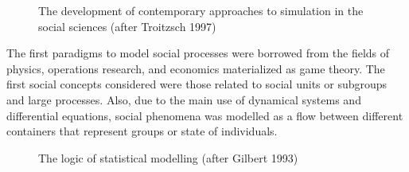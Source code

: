 \documentclass{report}
\begin{document}
\begin{figure}[tp]
\setlength\fboxsep{0pt}
\setlength\fboxrule{0.5pt}
\caption{The development of contemporary approaches to simulation in the social sciences (after Troitzsch 1997)}
\label{fig:SimTL}
\end{figure}


The first paradigms to model social processes were borrowed from the fields of physics, operations research, and economics materialized as game theory. The first social concepts considered were those related to social units or subgroups and large processes. Also, due to the main use of dynamical systems and differential equations, social phenomena was modelled as a flow between different containers that represent groups or state of individuals.\\

\begin{figure}[tp]
\setlength\fboxsep{0pt}
\setlength\fboxrule{0.5pt}
\caption{The logic of statistical modelling (after Gilbert 1993)}
\label{fig:SimTL}
\end{figure}
\end{document}
